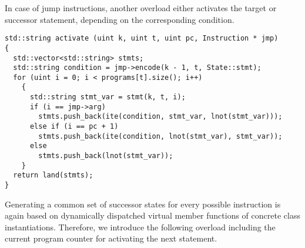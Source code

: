 \noindent
In case of jump instructions, another overload either activates the target or successor statement, depending on the corresponding condition.

\begin{lstlisting}[style=c++]
std::string activate (uint k, uint t, uint pc, Instruction * jmp)
{
  std::vector<std::string> stmts;
  std::string condition = jmp->encode(k - 1, t, State::stmt);
  for (uint i = 0; i < programs[t].size(); i++)
    {
      std::string stmt_var = stmt(k, t, i);
      if (i == jmp->arg)
        stmts.push_back(ite(condition, stmt_var, lnot(stmt_var)));
      else if (i == pc + 1)
        stmts.push_back(ite(condition, lnot(stmt_var), stmt_var));
      else
        stmts.push_back(lnot(stmt_var));
    }
  return land(stmts);
}
\end{lstlisting}


\noindent
Generating a common set of successor states for every possible instruction %
is again based on
dynamically dispatched virtual member functions of concrete  class instantiations.
Therefore, we introduce the following overload including the current program counter for activating the next statement. %

